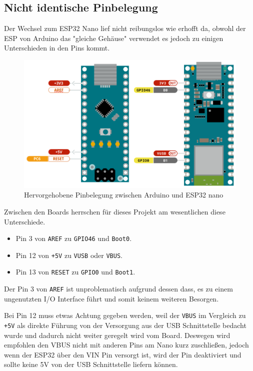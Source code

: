 \subsection{Nicht identische Pinbelegung}
\label{subsec:arduino_to_esp32}
Der Wechsel zum ESP32 Nano lief nicht reibungslos wie erhofft da,
obwohl der ESP von Arduino das "gleiche Gehäuse" verwendet 
es jedoch zu einigen Unterschieden in den Pins kommt. 

\begin{figure}[H]
    \includegraphics[width=\textwidth, center]{img/nano-differences-m.png}
    \caption{Hervorgehobene Pinbelegung zwischen Arduino und ESP32 nano}
    \label{fig:nano_boards}
\end{figure}

Zwischen den Boards herrschen für dieses Projekt am wesentlichen diese Unterschiede.
\begin{itemize}
    \item Pin 3 von \texttt{AREF} zu \texttt{GPIO46} und \texttt{Boot0}.
    \item Pin 12 von \texttt{+5V} zu \texttt{VUSB} oder \texttt{VBUS}.
    \item Pin 13 von \texttt{RESET} zu \texttt{GPIO0} und \texttt{Boot1}.
\end{itemize}

Der Pin 3 von \texttt{AREF} ist unproblematisch aufgrund dessen dass,
es zu einem ungenutzten I/O Interface führt und somit keinem weiteren Besorgen.

Bei Pin 12 muss etwas Achtung gegeben werden, weil der \texttt{VBUS} im Vergleich zu \texttt{+5V} als
direkte Führung von der Versorgung aus der USB Schnittstelle bedacht wurde und 
dadurch nicht weiter geregelt wird vom Board. Deswegen wird empfohlen den VBUS 
nicht mit anderen Pins am Nano kurz zuschließen, jedoch wenn der ESP32 über den VIN Pin versorgt ist, 
wird der Pin deaktiviert und sollte keine 5V von der USB Schnittstelle liefern können. 

